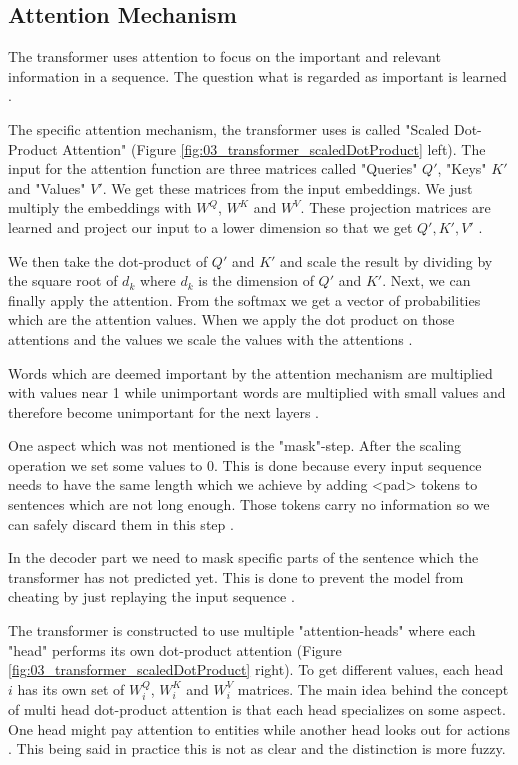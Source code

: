 \subsection{Attention Mechanism}

The transformer uses attention to focus on the important and relevant information in a sequence. The question what is regarded as important is learned \cite{Vaswani2017d}.

The specific attention mechanism, the transformer uses is called "Scaled Dot-Product Attention" {(Figure \ref{fig:03_transformer_scaledDotProduct} left)}. The input for the attention function are three matrices called "Queries" $Q'$, "Keys" $K'$ and "Values" $V'$. We get these matrices from the input embeddings. We just multiply the embeddings with $W^Q$, $W^K$ and $W^V$. These projection matrices are learned and project our input to a lower dimension so that we get $Q', K', V'$ \cite{Vaswani2017d}.
\bigskip

We then take the dot-product of $Q'$ and $K'$ and scale the result by dividing by the square root of $d_k$ where $d_k$ is the dimension of $Q'$ and $K'$. Next, we can finally apply the attention. From the softmax we get a vector of probabilities which are the attention values. When we apply the dot product on those attentions and the values we scale the values with the attentions \cite{Vaswani2017d}. 
\medskip

Words which are deemed important by the attention mechanism are multiplied with values near 1 while unimportant words are multiplied with small values and therefore become unimportant for the next layers \cite{Vaswani2017d}.
\medskip

One aspect which was not mentioned is the "mask"-step. After the scaling operation we set some values to 0. This is done because every input sequence needs to have the same length which we achieve by adding <pad> tokens to sentences which are not long enough. Those tokens carry no information so we can safely discard them in this step \cite{Vaswani2017d}. 

In the decoder part we need to mask specific parts of the sentence which the transformer has not predicted yet. This is done to prevent the model from cheating by just replaying the input sequence \cite{Vaswani2017d}.
\medskip

The transformer is constructed to use multiple "attention-heads" where each "head" performs its own dot-product attention {(Figure \ref{fig:03_transformer_scaledDotProduct} right)}. To get different values, each head $i$ has its own set of $W_i^Q$, $W_i^K$ and $W_i^V$ matrices. The main idea behind the concept of multi head dot-product attention is that each head specializes on some aspect. One head might pay attention to entities while another head looks out for actions \cite{Vaswani2017d}. This being said in practice this is not as clear and the distinction is more fuzzy.

